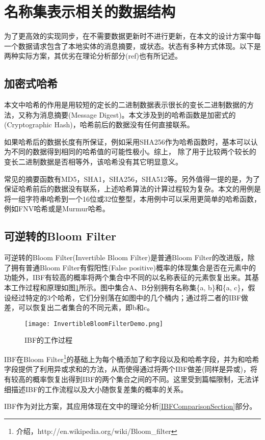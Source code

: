 \section{名称集表示相关的数据结构}
\par
为了更高效的实现同步，在不需要数据更新时不进行更新，在本文的设计方案中每一个数据请求包含了本地实体的消息摘要，或状态。状态有多种方式体现。以下是两种实际方案，其优劣在理论分析部分(ref)也有所记述。
\subsection{加密式哈希}
\par
本文中哈希的作用是用较短的定长的二进制数据表示很长的变长二进制数据的方法，又称为消息摘要(Message Digest)。本文涉及到的哈希函数是加密式的(Cryptographic Hash)，哈希前后的数据没有任何直接联系。
\par
如果哈希后的数据长度有所保证，例如采用SHA256作为哈希函数时，基本可以认为不同的数据得到相同的哈希值的可能性极小。综上， 除了用于比较两个较长的变长二进制数据是否相等外，该哈希没有其它明显意义。
\par
常见的摘要函数有MD5，SHA1，SHA256，SHA512等。另外值得一提的是，为了保证哈希前后的数据没有联系，上述哈希算法的计算过程较为复杂。本文的用例是将一组字符串哈希到一个16位或32位整型，本用例中可以采用更简单的哈希函数，例如FNV哈希或是Murmur哈希。
\subsection{可逆转的Bloom Filter}
\label{IBFIntroSection}
\par
可逆转的Bloom Filter(Invertible Bloom Filter)\cite{IBFRef}是普通Bloom Filter的改进版，除了拥有普通Bloom Filter有假阳性(False positive)概率的体现集合是否在元素中的功能外，IBF有较高的概率将两个集合中不同的以名称表征的元素恢复出来。其基本工作过程和原理如图\ref{fig:IBF}所示。图中集合A、B分别拥有名称集\{a, b\}和\{a, c\}，假设经过特定的3个哈希，它们分别落在如图中的几个桶内；通过将二者的IBF做差，可以恢复出二者集合的不同元素，即b和c。
\begin{figure}[h!]
	\centering
	\texttt{[image: InvertibleBloomFilterDemo.png]}
	\caption{IBF的工作过程}
	\label{fig:IBF}
\end{figure}
\par
IBF在Bloom Filter\footnote{介绍，http://en.wikipedia.org/wiki/Bloom\_filter}的基础上为每个桶添加了和字段以及和哈希字段，并为和哈希字段提供了利用异或求和的方法，从而使得通过将两个IBF做差(同样是异或)，将有较高的概率恢复出得到IBF的两个集合之间的不同。这里受到篇幅限制，无法详细描述IBF的工作流程以及大小随恢复差集的概率的关系。
\par
IBF作为对比方案，其应用体现在文中的理论分析\ref{IBFComparisonSection}部分。
